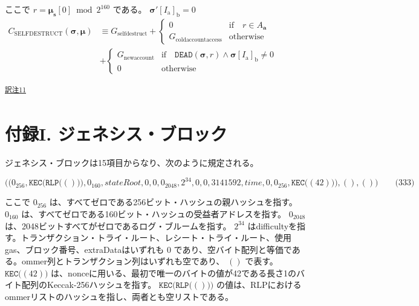 \documentclass[
]{ltjsarticle}
\begin{document}
\begin{longtable}[]
ここで \(r = \boldsymbol{\mu}_{\mathbf{s}}[0] \bmod 2^{160}\) である。
\(\boldsymbol{\sigma}'[I_{\mathrm{a}}]_{\mathrm{b}} = 0\)
\(\begin{aligned} C_{\text{SELFDESTRUCT}}(\boldsymbol{\sigma}, \boldsymbol{\mu}) &\equiv G_{\mathrm{selfdestruct}} + \begin{cases} 0 & \text{if}\quad r \in A_{\mathbf{a}}\\ G_{\mathrm{coldaccountaccess}} & \text{otherwise} \end{cases}\\ &+ \begin{cases} G_{\mathrm{newaccount}} & \text{if}\quad \mathtt{DEAD}(\boldsymbol{\sigma}, r) \wedge \boldsymbol{\sigma}[I_{\mathrm{a}}]_{\mathrm{b}} \neq 0 \\ 0 & \text{otherwise} \end{cases} \end{aligned}\) \\
\end{longtable}

\protect\hypertarget{tnref-11}{}{}\textsuperscript{\protect\hyperlink{tn-11}{訳注11}}

\protect\hypertarget{app:genesis}{}{}

\hypertarget{ux4ed8ux9332i.-ux30b8ux30a7ux30cdux30b7ux30b9ux30d6ux30edux30c3ux30af}{%
\section{付録I.
ジェネシス・ブロック}\label{ux4ed8ux9332i.-ux30b8ux30a7ux30cdux30b7ux30b9ux30d6ux30edux30c3ux30af}}

\hypertarget{Genesis_Block}{}

ジェネシス・ブロックは15項目からなり、次のように規定される。

\protect\hypertarget{eq-333}{}{}

\[\big( \big( 0_{256}, \mathtt{KEC}\big(\mathtt{RLP}\big( () \big)\big), 0_{160}, stateRoot, 0, 0, 0_{2048}, 2^{34}, 0, 0, 3141592, time, 0, 0_{256},  \mathtt{KEC}\big( (42) \big) \big), (), () \big) \qquad \text{(333)}\]

ここで \(0_{256}\)
は、すべてゼロである256ビット・ハッシュの親ハッシュを指す。 \(0_{160}\)
は、すべてゼロである160ビット・ハッシュの受益者アドレスを指す。
\(0_{2048}\) は、2048ビットすべてがゼロであるログ・ブルームを指す。
\(2^{34}\)
はdifficultyを指す。トランザクション・トライ・ルート、レシート・トライ・ルート、使用gas、ブロック番号、extraDataはいずれも
\(0\)
であり、空バイト配列と等価である。ommer列とトランザクション列はいずれも空であり、
\(()\) で表す。 \(\mathtt{KEC}\big( (42) \big)\)
は、nonceに用いる、最初で唯一のバイトの値が42である長さ1のバイト配列のKeccak-256ハッシュを指す。
\(\mathtt{KEC}\big(\mathtt{RLP}\big( () \big)\big)\)
の値は、RLPにおけるommerリストのハッシュを指し、両者とも空リストである。
\end{document}
